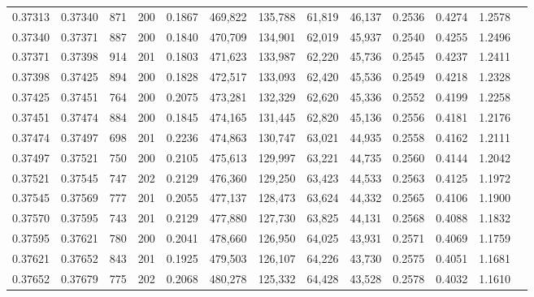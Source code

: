 \begin{tabular}{rrrrrrrrrrrrr}
0.37313 & 0.37340 &   871 & 200 &                                     0.1867 & 469,822 & 135,788 &  61,819 &  46,137 & 0.2536 & 0.4274 & 1.2578 \\
0.37340 & 0.37371 &   887 & 200 &                                     0.1840 & 470,709 & 134,901 &  62,019 &  45,937 & 0.2540 & 0.4255 & 1.2496 \\
0.37371 & 0.37398 &   914 & 201 &                                     0.1803 & 471,623 & 133,987 &  62,220 &  45,736 & 0.2545 & 0.4237 & 1.2411 \\
0.37398 & 0.37425 &   894 & 200 &                                     0.1828 & 472,517 & 133,093 &  62,420 &  45,536 & 0.2549 & 0.4218 & 1.2328 \\
0.37425 & 0.37451 &   764 & 200 &                                     0.2075 & 473,281 & 132,329 &  62,620 &  45,336 & 0.2552 & 0.4199 & 1.2258 \\
0.37451 & 0.37474 &   884 & 200 &                                     0.1845 & 474,165 & 131,445 &  62,820 &  45,136 & 0.2556 & 0.4181 & 1.2176 \\
0.37474 & 0.37497 &   698 & 201 &                                     0.2236 & 474,863 & 130,747 &  63,021 &  44,935 & 0.2558 & 0.4162 & 1.2111 \\
0.37497 & 0.37521 &   750 & 200 &                                     0.2105 & 475,613 & 129,997 &  63,221 &  44,735 & 0.2560 & 0.4144 & 1.2042 \\
0.37521 & 0.37545 &   747 & 202 &                                     0.2129 & 476,360 & 129,250 &  63,423 &  44,533 & 0.2563 & 0.4125 & 1.1972 \\
0.37545 & 0.37569 &   777 & 201 &                                     0.2055 & 477,137 & 128,473 &  63,624 &  44,332 & 0.2565 & 0.4106 & 1.1900 \\
0.37570 & 0.37595 &   743 & 201 &                                     0.2129 & 477,880 & 127,730 &  63,825 &  44,131 & 0.2568 & 0.4088 & 1.1832 \\
0.37595 & 0.37621 &   780 & 200 &                                     0.2041 & 478,660 & 126,950 &  64,025 &  43,931 & 0.2571 & 0.4069 & 1.1759 \\
0.37621 & 0.37652 &   843 & 201 &                                     0.1925 & 479,503 & 126,107 &  64,226 &  43,730 & 0.2575 & 0.4051 & 1.1681 \\
0.37652 & 0.37679 &   775 & 202 &                                     0.2068 & 480,278 & 125,332 &  64,428 &  43,528 & 0.2578 & 0.4032 & 1.1610 \\

\end{tabular}
